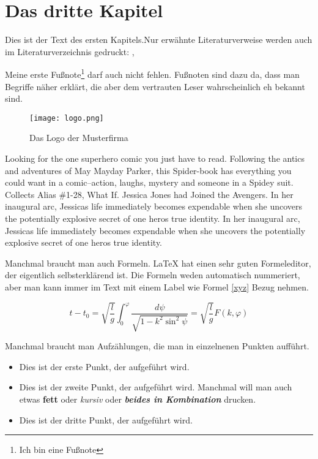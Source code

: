 \chapter{Das dritte Kapitel}
Dies ist der Text des ersten Kapitels.Nur erwähnte Literaturverweise werden auch im Literaturverzeichnis gedruckt: \cite[S.12 ff]{baumgartner:2002}, \cite[S.1-3]{dreyfus:1980}

Meine erste Fußnote\footnote{Ich bin eine Fußnote} darf auch nicht fehlen. Fußnoten sind dazu da, dass man Begriffe näher erklärt, die aber dem vertrauten Leser wahrscheinlich eh bekannt sind. 

\begin{figure}[h]
	\centering
	\texttt{[image: logo.png]}
	\caption{Das Logo der Musterfirma\footnotemark}
\end{figure}



Looking for the one superhero comic you just have to read. Following the antics and adventures of May Mayday Parker, this Spider-book has everything you could want in a comic--action, laughs, mystery and someone in a Spidey suit. Collects Alias \#1-28, What If. Jessica Jones had Joined the Avengers. In her inaugural arc, Jessicas life immediately becomes expendable when she uncovers the potentially explosive secret of one heros true identity. In her inaugural arc, Jessicas life immediately becomes expendable when she uncovers the potentially explosive secret of one heros true identity.

Manchmal braucht man auch Formeln. LaTeX hat einen sehr guten Formeleditor, der eigentlich selbsterklärend ist. Die Formeln weden automatisch nummeriert, aber man kann immer im Text mit einem Label wie Formel \ref{xyz} Bezug nehmen.

\begin{equation}
	t-t_{0}=\sqrt{\frac{l}{g}}\int_{0}^{\varphi}{\frac{d\psi}{\sqrt{1-k^{2}\sin^{2} {\psi}}}} = \sqrt{\frac{l}{g}} F(k,\varphi)
	\label{xyz}
\end{equation}

Manchmal braucht man Aufzählungen, die man in einzelnenen Punkten aufführt.
\begin{itemize}
	\item Dies ist der erste Punkt, der aufgeführt wird.
	\item Dies ist der zweite Punkt, der aufgeführt wird. Manchmal will man auch etwas \textbf{fett} oder \textit{kursiv} oder \textbf{\textit{beides in Kombination}}  drucken.
	\item Dies ist der dritte Punkt, der aufgeführt wird.
\end{itemize}

